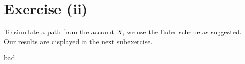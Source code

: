 \section*{Exercise (ii)}

To simulate a path from the account $X$, we use the Euler scheme as suggested. Our results
are displayed in the next subexercise.

bad